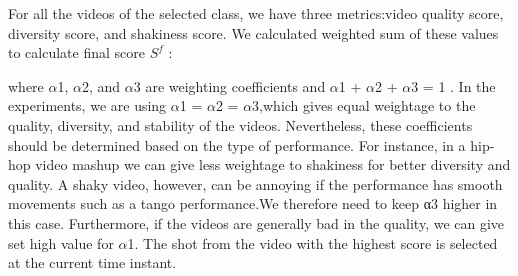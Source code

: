 \documentclass{sig-alternate}
\begin{document}
For all the videos of the selected class, we have three metrics:video quality score, diversity score, and shakiness score. We calculated weighted sum of these values to calculate final score $S^f$ :

where  $\alpha$1, $\alpha$2, and $\alpha$3 are weighting coefficients and $ \alpha$1 + $\alpha$2 + $\alpha$3 = 1 . In the experiments, we are using $\alpha$1 = $\alpha$2 = $\alpha$3,which gives equal weightage to the quality, diversity, and stability of the videos. Nevertheless, these coefficients should be determined based on the type of performance. For instance, in a hip-hop video mashup we can give less weightage to shakiness for better diversity and quality. A shaky video, however, can be annoying if the performance has smooth movements such as a tango performance.We therefore need to keep α3 higher in this case. Furthermore, if the videos are generally bad in the quality, we can give set high value for $\alpha$1. The shot from the video with the highest score is selected at the current time instant.
\end{document}
